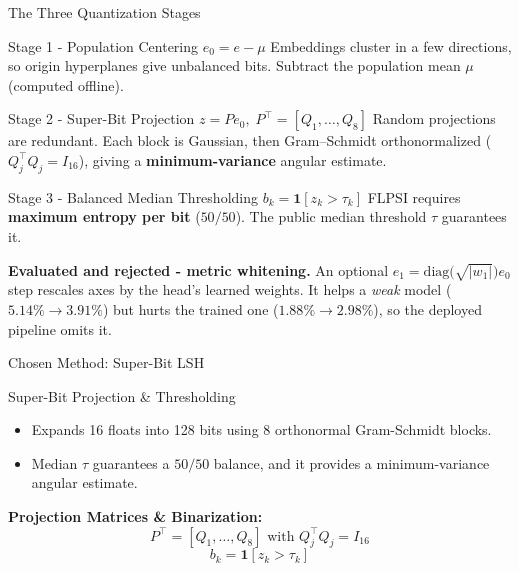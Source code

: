 \documentclass{beamer}
\begin{document}
\begin{frame}{The Three Quantization Stages}
  \begin{block}{Stage 1 - Population Centering \hfill $e_0 = e - \mu$}
    {\footnotesize Embeddings cluster in a few directions, so origin hyperplanes give
    \alert{unbalanced bits}. Subtract the population mean $\mu$ (computed offline).}
  \end{block}

  \begin{block}{Stage 2 - Super-Bit Projection \hfill $z = P e_0,\; P^\top=[Q_1,\dots,Q_8]$}
    {\footnotesize Random projections are redundant. Each block is Gaussian, then Gram--Schmidt
    orthonormalized ($Q_j^\top Q_j = I_{16}$), giving a \textbf{minimum-variance} angular estimate.}
  \end{block}

  \begin{block}{Stage 3 - Balanced Median Thresholding \hfill $b_k = \mathbf{1}[z_k > \tau_k]$}
    {\footnotesize FLPSI requires \textbf{maximum entropy per bit} ($50/50$). The public median
    threshold $\tau$ guarantees it.}
  \end{block}

  \vspace{0.15cm}
  {\footnotesize \textbf{Evaluated and rejected - metric whitening.} An optional
  $e_1=\mathrm{diag}\big(\sqrt{|w_1|}\big)e_0$ step rescales axes by the head's learned weights.
  It helps a \emph{weak} model ($5.14\%\!\to\!3.91\%$) but \alert{hurts the trained one}
  ($1.88\%\!\to\!2.98\%$), so the deployed pipeline omits it.}
\end{frame}

\begin{frame}{Chosen Method: Super-Bit LSH}
  \begin{block}{Super-Bit Projection \& Thresholding}
    \begin{itemize}
      \item Expands 16 floats into 128 bits using 8 orthonormal Gram-Schmidt blocks.
      \item Median $\tau$ guarantees a $50/50$ balance, and it provides a minimum-variance angular estimate.
    \end{itemize}
  \end{block}
  
  \vspace{0.2cm}
  \textbf{Projection Matrices \& Binarization:}
  \[
    P^\top = [Q_1,\dots,Q_8] \text{ with } Q_j^\top Q_j = I_{16}
  \]
  \[
    b_k = \mathbf{1}[z_k > \tau_k]
  \]
\end{frame}
\end{document}
